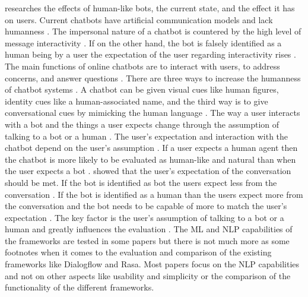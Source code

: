 \citet{GO2019304} researches the effects of human-like bots, the current state, and the 
effect it has on users.
Current chatbots have artificial communication models and lack humanness \citet{GO2019304}.
The impersonal nature of a chatbot is countered by the high level of message interactivity \cite{GO2019304}.
If on the other hand, the bot is falsely identified as a human being by a user the expectation of the user regarding 
interactivity rises \cite{GO2019304}.
The main functions of online chatbots are to interact with users, to address concerns, and answer questions \cite{GO2019304}. 
There are three ways to increase the humanness of chatbot systems \cite{GO2019304}.
A chatbot can be given visual cues like human figures, identity cues like a human-associated name, and the third way is to 
give conversational cues by mimicking the human language \cite{GO2019304}.
The way a user interacts with a bot and the things a user expects change through the assumption of talking to a bot or a human \cite{GO2019304}.
The user's expectation and interaction with the chatbot depend on the user's assumption \citet{sundar2016theoretical, GO2019304}.
If a user expects a human agent then the chatbot is more likely to be evaluated as human-like and natural than when the user expects a bot \cite{sundar2016theoretical}.
\citet{GO2019304} showed that the user's expectation of the conversation should be met.
If the bot is identified as bot the users expect less from the conversation \cite{GO2019304}.
If the bot is identified as a human than the users expect more from the conversation and the bot needs to be capable of more 
to match the user's expectation \citet{GO2019304}.
The key factor is the user's assumption of talking to a bot or a human and greatly influences the evaluation \cite{GO2019304}.
The ML and NLP capabilities of the frameworks are tested in some papers but there is not much more as some footnotes when it 
comes to the evaluation and comparison of the existing frameworks like Dialogflow and Rasa.
Most papers focus on the NLP capabilities and not on other aspects like usability and simplicity or the comparison of the 
functionality of the different frameworks.
